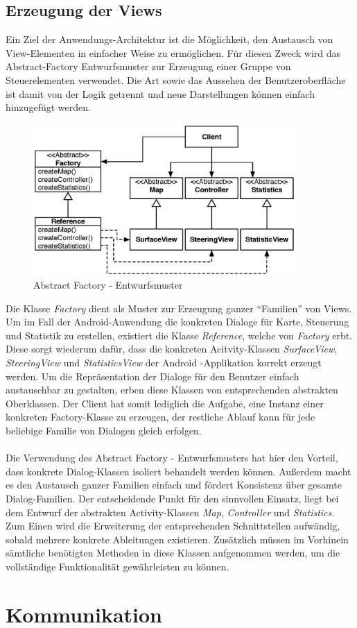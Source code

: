 \documentclass[10pt,a4paper]{article}
\let\oldsection\section
\renewcommand{\section}{\newpage \oldsection}
\begin{document}
  		\subsection{Erzeugung der Views}
  			Ein Ziel der Anwendungs-Architektur ist die Möglichkeit, den Austausch von View-Elementen in einfacher Weise zu ermöglichen. Für diesen
  			Zweck wird das Abstract-Factory Entwurfsmuster zur Erzeugung einer Gruppe von Steuerelementen verwendet. Die Art sowie das Aussehen der
  			Benutzeroberfläche ist damit von der Logik getrennt und neue Darstellungen können einfach hinzugefügt werden.
			\begin{figure}[h]
				\centering
				\includegraphics[width=10cm]{images/android_abstrfact.eps}
  				\caption{Abstract Factory - Entwurfsmuster}
  			\end{figure}
  			Die Klasse \textit{Factory} dient als Muster zur Erzeugung ganzer ``Familien'' von Views. Um im Fall der Android-Anwendung die konkreten
  			Dialoge für Karte, Steuerung und Statistik zu erstellen, existiert die Klasse \textit{Reference}, welche von \textit{Factory} erbt. Diese sorgt
  			wiederum dafür, dass die konkreten Acitvity-Klassen \textit{SurfaceView}, \textit{SteeringView} und \textit{StatisticsView} der Android
  			-Applikation korrekt erzeugt werden. Um die Repräsentation der Dialoge für den Benutzer einfach austauschbar zu gestalten, erben diese Klassen
  			von entsprechenden abstrakten Oberklassen. Der Client hat somit lediglich die Aufgabe, eine Instanz einer konkreten Factory-Klasse zu
  			erzeugen, der restliche Ablauf kann für jede beliebige Familie von Dialogen gleich erfolgen. \\ \\
  			Die Verwendung des Abstract Factory - Entwurfsmusters hat hier den Vorteil, dass konkrete Dialog-Klassen isoliert behandelt werden können.
  			Außerdem macht es den Austausch ganzer Familien einfach und fördert Konsistenz über gesamte Dialog-Familien. Der entscheidende Punkt für
  			den sinnvollen Einsatz, liegt bei dem Entwurf der abstrakten Activity-Klassen \textit{Map}, \textit{Controller} und \textit{Statistics}. Zum Einen
  			wird die Erweiterung der entsprechenden Schnittstellen aufwändig, sobald mehrere konkrete Ableitungen existieren. Zusätzlich müssen im
 			Vorhinein sämtliche benötigten Methoden in diese Klassen aufgenommen werden, um die vollständige Funktionalität gewährleisten zu können. 
	\section{Kommunikation}
				
	\newpage	
	\printglossary[style=altlist,title=Glossar]
						
\end{document}

